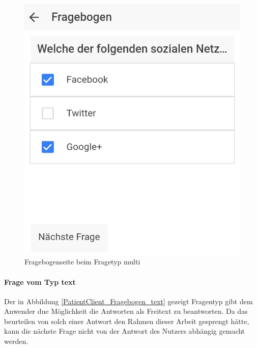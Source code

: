 \begin{figure}[H]
	\centering
	\includegraphics[scale=0.3]{images/Screenshots/PatientClient/Fragebogen_multi}
	\caption[Fragebogenseite beim Fragetyp multi]{Fragebogenseite beim Fragetyp multi}
	\label{PatientClient_Fragebogen_multi}
\end{figure}
\newpage
\paragraph{Frage vom Typ text}
Der in Abbildung \ref{PatientClient_Fragebogen_text} gezeigt Fragentyp gibt dem Anwender due Möglichkeit die Antworten als Freitext zu beantworten. Da das beurteilen von solch einer Antwort den Rahmen dieser Arbeit gesprengt hätte, kann die nächste Frage nicht von der Antwort des Nutzers abhängig gemacht werden.

